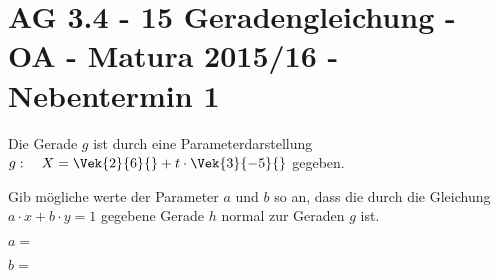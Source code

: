 \section{AG 3.4 - 15 Geradengleichung - OA - Matura 2015/16
- Nebentermin 1}

\begin{beispiel}[AG 3.4]{1} %
Die Gerade $g$ ist durch eine Parameterdarstellung $g:\quad X=\Vek{2}{6}{}+t\cdot \Vek{3}{-5}{}$ gegeben. \leer

Gib mögliche werte der Parameter $a$ und $b$ so an, dass die durch die Gleichung $a\cdot x+b\cdot y=1$ gegebene Gerade $h$ normal zur Geraden $g$ ist. \leer

$a=$ 

$b=$ 
\end{beispiel}